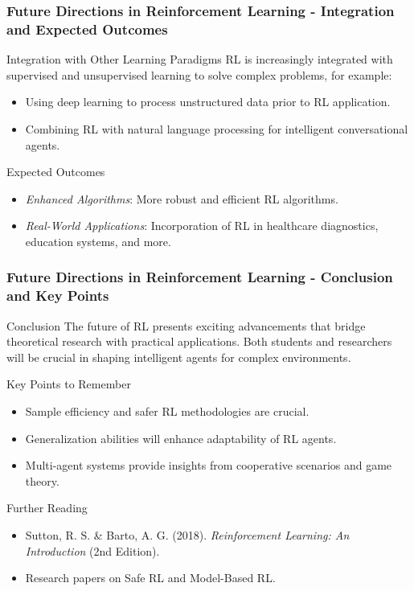 \documentclass[aspectratio=169]{beamer}
\begin{document}
\begin{frame}[fragile]
    \frametitle{Future Directions in Reinforcement Learning - Integration and Expected Outcomes}
    \begin{block}{Integration with Other Learning Paradigms}
        RL is increasingly integrated with supervised and unsupervised learning to solve complex problems, for example:
        \begin{itemize}
            \item Using deep learning to process unstructured data prior to RL application.
            \item Combining RL with natural language processing for intelligent conversational agents.
        \end{itemize}
    \end{block}

    \begin{block}{Expected Outcomes}
        \begin{itemize}
            \item \textit{Enhanced Algorithms}: More robust and efficient RL algorithms.
            \item \textit{Real-World Applications}: Incorporation of RL in healthcare diagnostics, education systems, and more.
        \end{itemize}
    \end{block}
\end{frame}

\begin{frame}[fragile]
    \frametitle{Future Directions in Reinforcement Learning - Conclusion and Key Points}
    \begin{block}{Conclusion}
        The future of RL presents exciting advancements that bridge theoretical research with practical applications. Both students and researchers will be crucial in shaping intelligent agents for complex environments.
    \end{block}

    \begin{block}{Key Points to Remember}
        \begin{itemize}
            \item Sample efficiency and safer RL methodologies are crucial.
            \item Generalization abilities will enhance adaptability of RL agents.
            \item Multi-agent systems provide insights from cooperative scenarios and game theory.
        \end{itemize}
    \end{block}

    \begin{block}{Further Reading}
        \begin{itemize}
            \item Sutton, R. S. \& Barto, A. G. (2018). \textit{Reinforcement Learning: An Introduction} (2nd Edition).
            \item Research papers on Safe RL and Model-Based RL.
        \end{itemize}
    \end{block}
\end{frame}
\end{document}
